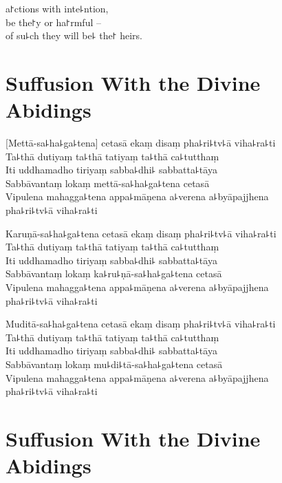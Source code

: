  a꜓ctions with inte꜕ntion,\\
be the꜓y  or ha꜓rmful --\\
of su꜕ch  they will be꜕ the꜓ heirs.

\chapter[Divine Abidings]{Suffusion With the Divine Abidings}%

\begin{leader}
\end{leader}

[Mettā-sa꜕ha꜕ga꜕tena] cetasā ekaṃ disaṃ pha꜕ri꜕tv꜕ā viha꜕ra꜕ti\\
Ta꜕thā dutiyaṃ ta꜕thā tatiyaṃ ta꜕thā ca꜕tutthaṃ\\
Iti uddhamadho tiriyaṃ sabba꜕dhi꜕ sabbatta꜕tāya\\
Sabbāvantaṃ lokaṃ mettā-sa꜕ha꜕ga꜕tena cetasā\\
Vipulena mahagga꜕tena appa꜕māṇena a꜕verena a꜕byāpajjhena\\
\vin pha꜕ri꜕tv꜕ā viha꜕ra꜕ti

Karuṇā-sa꜕ha꜕ga꜕tena cetasā ekaṃ disaṃ pha꜕ri꜕tv꜕ā viha꜕ra꜕ti\\
Ta꜕thā dutiyaṃ ta꜕thā tatiyaṃ ta꜕thā ca꜕tutthaṃ\\
Iti uddhamadho tiriyaṃ sabba꜕dhi꜕ sabbatta꜕tāya\\
Sabbāvantaṃ lokaṃ ka꜕ru꜕ṇā-sa꜕ha꜕ga꜕tena cetasā\\
Vipulena mahagga꜕tena appa꜕māṇena a꜕verena a꜕byāpajjhena\\
\vin pha꜕ri꜕tv꜕ā viha꜕ra꜕ti

Muditā-sa꜕ha꜕ga꜕tena cetasā ekaṃ disaṃ pha꜕ri꜕tv꜕ā viha꜕ra꜕ti\\
Ta꜕thā dutiyaṃ ta꜕thā tatiyaṃ ta꜕thā ca꜕tutthaṃ\\
Iti uddhamadho tiriyaṃ sabba꜕dhi꜕ sabbatta꜕tāya\\
Sabbāvantaṃ lokaṃ mu꜕di꜕tā-sa꜕ha꜕ga꜕tena cetasā\\
Vipulena mahagga꜕tena appa꜕māṇena a꜕verena a꜕byāpajjhena\\
\vin pha꜕ri꜕tv꜕ā viha꜕ra꜕ti


\chapter[Divine Abidings]{Suffusion With the Divine Abidings}%


